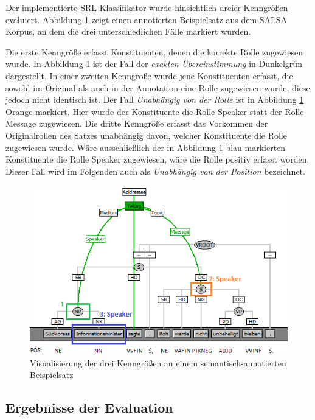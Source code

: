 \documentclass[12pt]{article}
\begin{document}
Der implementierte SRL-Klassifikator wurde hinsichtlich dreier Kenngrößen evaluiert. Abbildung \ref{evalKenngroeszen} zeigt einen annotierten Beispielsatz aus dem SALSA Korpus, an dem die drei unterschiedlichen Fälle markiert wurden.

Die erste Kenngröße erfasst Konstituenten, denen die korrekte Rolle zugewiesen wurde. In Abbildung \ref{evalKenngroeszen} ist der Fall der \textit{exakten Übereinstimmung} in Dunkelgrün dargestellt. 
In einer zweiten Kenngröße wurde jene Konstituenten erfasst, die sowohl im Original als auch in der Annotation eine Rolle zugewiesen wurde, diese jedoch nicht identisch ist. Der Fall \textit{Unabhängig von der Rolle} ist in Abbildung \ref{evalKenngroeszen} Orange markiert. Hier wurde der Konstituente die Rolle Speaker statt der Rolle Message zugewiesen.
Die dritte Kenngröße erfasst das Vorkommen der Originalrollen des Satzes unabhängig davon, welcher Konstituente die Rolle zugewiesen wurde. Wäre ausschließlich der in Abbildung \ref{evalKenngroeszen} blau markierten Konstituente die Rolle Speaker zugewiesen, wäre die Rolle positiv erfasst worden. Dieser Fall wird im Folgenden auch als \textit{Unabhängig von der Position} bezeichnet.

		\begin{figure}[tb!]
			\centering
			\includegraphics{images/evaluation_kenngroeszen.png}
			\caption[Visualisierung der Kenngrößen]{Visualisierung der drei Kenngrößen an einem semantisch-annotierten Beispielsatz}
			\label{evalKenngroeszen}
		\end{figure}


\subsection{Ergebnisse der Evaluation}
\end{document}
